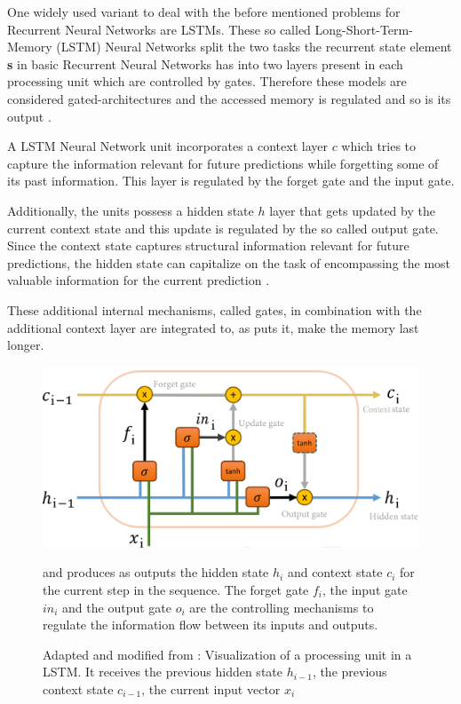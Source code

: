 One widely used variant to deal with the before mentioned problems for Recurrent Neural Networks are LSTMs. 
These so called Long-Short-Term-Memory (LSTM) Neural Networks split the two tasks the recurrent state element \textbf{s} in basic Recurrent Neural Networks has into two layers present in each processing unit which are controlled by gates. 
Therefore these models are considered gated-architectures and the accessed memory is regulated and so is its output \citep{goldberg2017neural}.

A LSTM Neural Network unit incorporates a context layer $c$ which tries to capture the information relevant for future predictions while forgetting some of its past information. 
This layer is regulated by the forget gate and the input gate.

Additionally, the units possess a hidden state $h$ layer that gets updated by the current context state and this update is regulated by the so called output gate. Since the context state captures structural information relevant for future predictions, the hidden state can capitalize on the task of encompassing the most valuable information for the current prediction \citep{jurafsky2021}.

These additional internal mechanisms, called gates, in combination with the additional context layer are integrated to, as  \citet{embedding2020pilehvar} puts it, make the memory last longer.


\begin{figure}
    \includegraphics[width=\linewidth]{Pictures/Pilehvar_20_LSTM.png}
    \caption{Adapted and modified from \citet{embedding2020pilehvar}: Visualization of a processing unit in a LSTM. It receives the previous hidden state $h_{i-1}$, the previous context state $c_{i-1}$, the current input vector $x_i$} and produces as outputs the hidden state $h_i$ and context state $c_i$ for the current step in the sequence. The forget gate $f_i$, the input gate $in_i$ and the output gate $o_i$ are the controlling mechanisms to regulate the information flow between its inputs and outputs.
    \label{fig:LSTM}
\end{figure}

